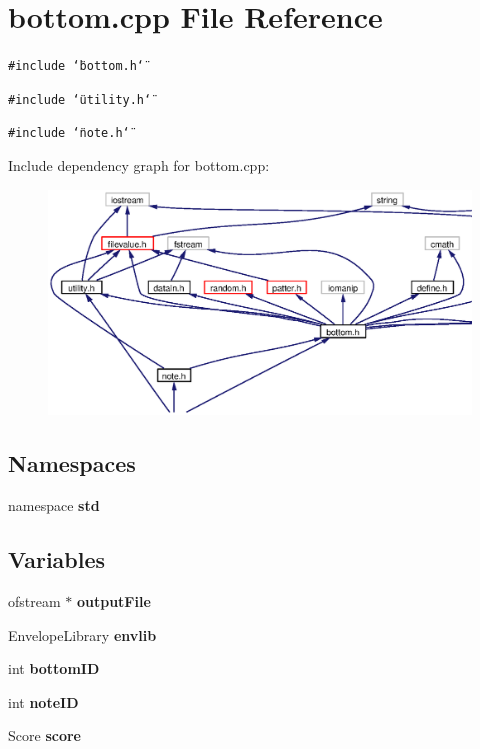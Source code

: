 \section{bottom.cpp File Reference}
\label{bottom_8cpp}
{\tt \#include \char`\"{}bottom.h\char`\"{}}\par
{\tt \#include \char`\"{}utility.h\char`\"{}}\par
{\tt \#include \char`\"{}note.h\char`\"{}}\par


Include dependency graph for bottom.cpp:\begin{figure}[H]
\begin{center}
\leavevmode
\includegraphics[width=393pt]{bottom_8cpp__incl}
\end{center}
\end{figure}
\subsection*{Namespaces}
\begin{CompactItemize}
\item 
namespace {\bf std}
\end{CompactItemize}
\subsection*{Variables}
\begin{CompactItemize}
\item 
ofstream $\ast$ {\bf output\-File}
\item 
Envelope\-Library {\bf envlib}
\item 
int {\bf bottom\-ID}
\item 
int {\bf note\-ID}
\item 
Score {\bf score}
\end{CompactItemize}


